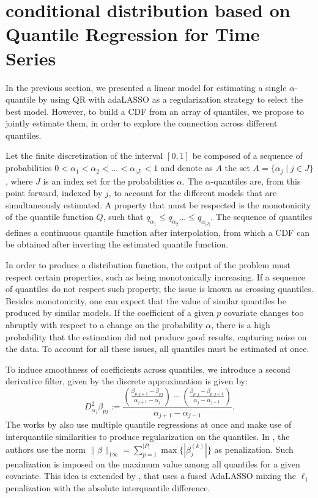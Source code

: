 \section{conditional distribution based on Quantile Regression for Time Series}

In the previous section, we presented a linear model for estimating a single $\alpha$-quantile by using QR with adaLASSO as a regularization strategy to select the best model. However, to build a CDF from an array of quantiles, we propose to jointly estimate them, in order to explore the connection across different quantiles. 

Let the finite discretization of the interval $[0,1]$ be composed of a sequence of probabilities $0 < \alpha_1 < \alpha_2 < \dots < \alpha_{|J|} < 1$ and denote as $A$ the set $A = \{ \alpha_j \mid j \in J \}$, where $J$ is an index set for the probabilities $\alpha$. 
The $\alpha$-quantiles are, from this point forward, indexed by $j$, to account for the different models that are simultaneously estimated. A property that must be respected is the monotonicity of the quantile function $Q$, such that $q_{\alpha_1} \leq q_{\alpha_2} \dots \leq q_{\alpha_{|J|}}$.
The sequence of quantiles defines a continuous quantile function after interpolation, from which a CDF can be obtained after inverting the estimated quantile function.


In order to produce a distribution function, the output of the problem must respect certain properties, such as being monotonically increasing. 
If a sequence of quantiles do not respect such property, the issue is known as crossing quantiles.
Besides monotonicity, one can expect that the value of similar quantiles be produced by similar models. 
If the coefficient of a given $p$ covariate changes too abruptly with respect to a change on the probability $\alpha$, there is a high probability that the estimation did not produce good results, capturing noise on the data.  
To account for all these issues, all quantiles must be estimated at once. 

To induce smoothness of coefficients across quantiles, we introduce a second derivative filter, given by the discrete approximation is given by:
\begin{equation}
D_{\alpha_j}^{2} \beta_{pj} := \frac{\left(\frac{\beta_{p,j+1}-\beta_{pj}}{\alpha_{j+1}-\alpha_{j}}\right)-\left(\frac{\beta_{p,j}-\beta_{p,j-1}}{\alpha_{j}-\alpha_{j-1}}\right)}{\alpha_{j+1}-\alpha_{j-1}}. 
\end{equation}
The works by \cite{zou_regularized_2008, jiang_interquantile_2014} also use multiple quantile regressions at once and make use of interquantile similarities to produce regularization on the quantiles. In \cite{zou_regularized_2008}, the authors use the norm $\| \beta \|_{1\infty}=\sum_{p=1}^{|P|} \max\{ |\beta_j^{(k)} |\}$ as penalization. Such penalization is imposed on the maximum value among all quantiles for a given covariate. This idea is extended by \cite{jiang_interquantile_2014}, that uses a fused AdaLASSO mixing the $\ell_1$ penalization with the absolute interquantile difference.

